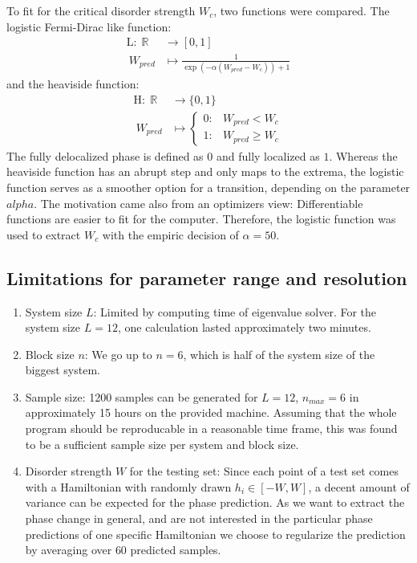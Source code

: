 \documentclass[reprint,amsmath,amssymb,aps,prb]{revtex4-2}
\begin{document}
To fit for the critical disorder strength $W_c$, two functions were compared. The logistic Fermi-Dirac like function:
\begin{align}
\text{L} \colon \;\mathbb {R} &\to \left[0,1\right]\\
\ W_{pred}&\mapsto \frac{1}{\exp\left(-\alpha \left(W_{pred}-W_c\right)\right)+1}
\end{align}
and the heaviside function:
\begin{align}
\text{H} \colon \;
\mathbb {R} &\to \{0,1\}\\
\ W_{pred}&\mapsto 
\begin{cases}
0:&W_{pred}<W_c\\1:&W_{pred}\geq W_c
\end{cases}
	\end{align}
The fully delocalized phase is defined as $0$ and fully localized as $1$. Whereas the heaviside function has an abrupt step and only maps to the extrema, the logistic function serves as a smoother option for a transition, depending on the parameter $alpha$. The motivation came also from an optimizers view: Differentiable functions are easier to fit for the computer.\cite{Kyurkchiev2015} Therefore, the logistic function was used to extract $W_c$ with the empiric decision of $\alpha=50$.

\subsection{Limitations for parameter range and resolution}\label{sec:param}

\begin{enumerate}
	\item System size $L$: Limited by computing time of eigenvalue solver. For the system size $L=12$, one calculation lasted approximately two minutes.
	\item Block size $n$: We go up to $n=6$, which is half of the system size of the biggest system.
	\item Sample size: 1200 samples can be generated for $L=12$, $n_{max}=6$ in approximately 15 hours on the provided machine. Assuming that the whole program should be reproducable in a reasonable time frame, this was found to be a sufficient sample size per system and block size.
	\item Disorder strength $W$ for the testing set: Since each point of a test set comes with a Hamiltonian with randomly drawn $h_i\in\left[-W,W\right]$, a decent amount of variance can be expected for the phase prediction. As we want to extract the phase change in general, and are not interested in the particular phase predictions of one specific Hamiltonian we choose to regularize the prediction by averaging over $60$ predicted samples.
\end{enumerate}%
\end{document}
